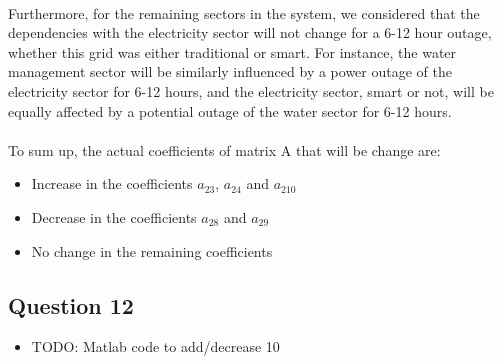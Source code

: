 \documentclass[11pt,a4paper]{article}
\begin{document}
\\ 
Furthermore, for the remaining sectors in the system, we considered that the dependencies with the electricity sector will not change for a 6-12 hour outage, whether this grid was either traditional or smart. For instance, the water management sector will be similarly influenced by a power outage of the electricity sector for 6-12 hours, and the electricity sector, smart or not, will be equally affected by a potential outage of the water sector for 6-12 hours.\\
\\
To sum up, the actual coefficients of matrix A that will be change are: 
\begin{itemize}
	\item Increase in the coefficients $a_{23}$, $a_{24}$ and $a_{210}$
	\item Decrease in the coefficients $a_{28}$ and $a_{29}$
	\item No change in the remaining coefficients
\end{itemize}

\subsection*{Question 12}
\begin{itemize}
	\item TODO: Matlab code to add/decrease 10%
\end{itemize}
\end{document}
